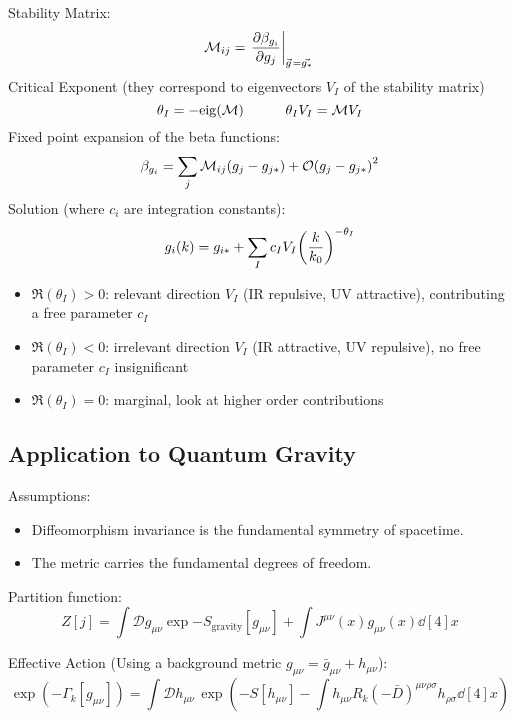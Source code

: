 		\noindent
		Stability Matrix:
		\begin{equation}
			\mathcal{M}_{ij} = \eval{\pdv{\beta_{g_i}}{g_j}}_{\vec{g} = \vec{g_*}}
		\end{equation}
		Critical Exponent (they correspond to eigenvectors $V_I$ of the stability matrix)
		\begin{equation}
			\theta_I = - \mathrm{eig}(\mathcal{M})
			\hspace{30pt} \theta_I V_I = \mathcal{M} V_I
		\end{equation}
		Fixed point expansion of the beta functions:
		\begin{equation}
			\beta_{g_i} = \sum_{j} \mathcal{M}_{ij} \qty(g_j - g_{j*}) + \mathcal{O}\qty(g_j - g_{j*})^2
		\end{equation}
		Solution (where $c_i$ are integration constants):
		\begin{equation}
			g_i(k) = g_{i*} + \sum_I c_I V_I \qty(\frac{k}{k_0})^{-\theta_I}
		\end{equation}
		\begin{itemize}
			\item $\Re(\theta_I) > 0$: relevant direction $V_I$ (IR repulsive, UV attractive), contributing a free parameter $c_I$
			\item $\Re(\theta_I) < 0$: irrelevant direction $V_I$ (IR attractive, UV repulsive), no free parameter $c_I$ insignificant
			\item $\Re(\theta_I) = 0$: marginal, look at higher order contributions
		\end{itemize}

	\subsection{Application to Quantum Gravity}
		Assumptions:
		\begin{itemize}
			\item Diffeomorphism invariance is the fundamental symmetry of spacetime.
			\item The metric carries the fundamental degrees of freedom.
		\end{itemize}

		\noindent
		Partition function:
		\begin{equation}
			Z[j] = \int \mathcal{D} g_{\mu\nu} \exp{-S_\text{gravity}[g_{\mu\nu}] + \int J^{\mu\nu}(x) g_{\mu\nu}(x) \dd[4]{x}}
		\end{equation}

		\noindent
		Effective Action (Using a background metric $g_{\mu\nu} = \bar{g}_{\mu\nu} + h_{\mu\nu}$):
		\begin{equation}
			\exp(-\Gamma_k[g_{\mu\nu}]) = \int \mathcal{D}h_{\mu\nu} \, \exp(-S[h_{\mu\nu}] - \int h_{\mu\nu} R_k(-\bar{D})^{\mu\nu\rho\sigma}h_{\rho\sigma} \dd[4]{x})
		\end{equation}

